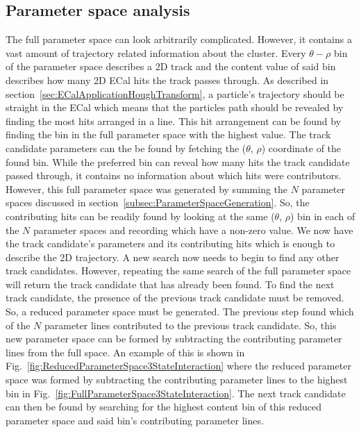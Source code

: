 \subsection{Parameter space analysis}
\label{subsec:ParameterSpaceAnalysis}
The full parameter space can look arbitrarily complicated. However, it contains a vast amount of trajectory related information about the cluster.  Every $\theta-\rho$ bin of the parameter space describes a 2D track and the content value of said bin describes how many 2D ECal hits the track passes through.  As described in section~\ref{sec:ECalApplicationHoughTransform}, a particle's trajectory should be straight in the ECal which means that the particles path should be revealed by finding the most hits arranged in a line.  This hit arrangement can be found by finding the bin in the full parameter space with the highest value.  The track candidate parameters can the be found by fetching the ($\theta$, $\rho$) coordinate of the found bin.
\newline
\newline
While the preferred bin can reveal how many hits the track candidate passed through, it contains no information about which hits were contributors.  However, this full parameter space was generated by summing the $N$ parameter spaces discussed in section~\ref{subsec:ParameterSpaceGeneration}.  So, the contributing hits can be readily found by looking at the same ($\theta$, $\rho$) bin in each of the $N$ parameter spaces and recording which have a non-zero value.  We now have the track candidate's parameters and its contributing hits which is enough to describe the 2D trajectory.
\newline
\newline
A new search now needs to begin to find any other track candidates.  However, repeating the same search of the full parameter space will return the track candidate that has already been found.  To find the next track candidate, the presence of the previous track candidate must be removed.  So, a reduced parameter space must be generated. The previous step found which of the $N$ parameter lines contributed to the previous track candidate.  So, this new parameter space can be formed by subtracting the contributing parameter lines from the full space.  An example of this is shown in Fig.~\ref{fig:ReducedParameterSpace3StateInteraction} where the reduced parameter space was formed by subtracting the contributing parameter lines to the highest bin in Fig.~\ref{fig:FullParameterSpace3StateInteraction}.  The next track candidate can then be found by searching for the highest content bin of this reduced parameter space and said bin's contributing parameter lines. 
